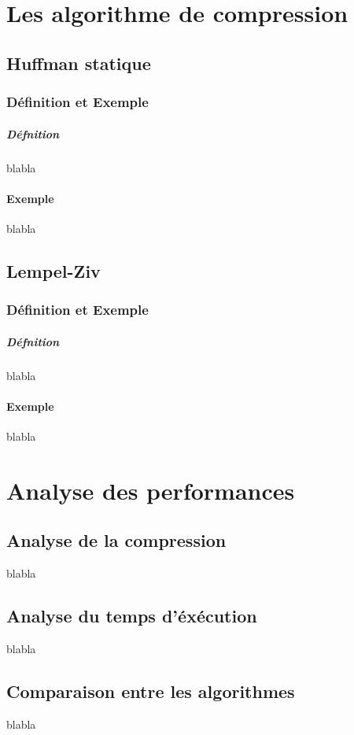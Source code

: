 \documentclass{report}
\begin{document}
\part{Les algorithme de compression}
\chapter*{Huffman statique}
\section*{Définition et Exemple }
\subsubsection*{Défnition}
blabla 
\subsection*{Exemple}
blabla
\chapter*{Lempel-Ziv}
\section*{Définition et Exemple }
\subsubsection*{Défnition}
blabla 
\subsection*{Exemple}
blabla
\part{Analyse des performances}
\chapter*{Analyse de la compression}
blabla
\chapter*{Analyse du temps d'éxécution }
blabla
\chapter*{Comparaison entre les algorithmes}
blabla
\end{document}
